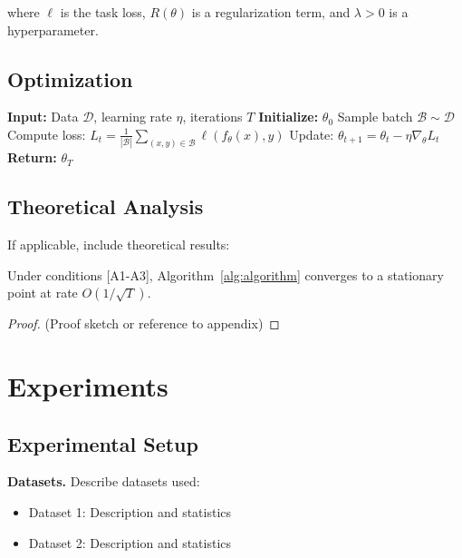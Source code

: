 \documentclass{article}
\begin{document}
where $\ell$ is the task loss, $R(\theta)$ is a regularization term,
and $\lambda > 0$ is a hyperparameter.

\subsection{Optimization}

\begin{algorithm}[tb]
   \caption{Proposed Algorithm}
   \label{alg:algorithm}
\begin{algorithmic}
   \STATE \textbf{Input:} Data $\mathcal{D}$, learning rate $\eta$, iterations $T$
   \STATE \textbf{Initialize:} $\theta_0$
       \STATE Sample batch $\mathcal{B} \sim \mathcal{D}$
       \STATE Compute loss: $L_t = \frac{1}{|\mathcal{B}|}\sum_{(x,y)\in\mathcal{B}} \ell(f_\theta(x), y)$
       \STATE Update: $\theta_{t+1} = \theta_t - \eta \nabla_\theta L_t$
   \ENDFOR
   \STATE \textbf{Return:} $\theta_T$
\end{algorithmic}
\end{algorithm}

\subsection{Theoretical Analysis}

If applicable, include theoretical results:

\begin{theorem}
\label{thm:main}
Under conditions [A1-A3], Algorithm~\ref{alg:algorithm} converges to a
stationary point at rate $O(1/\sqrt{T})$.
\end{theorem}

\begin{proof}
(Proof sketch or reference to appendix)
\end{proof}

\section{Experiments}
\label{sec:experiments}

\subsection{Experimental Setup}

\textbf{Datasets.} Describe datasets used:
\begin{itemize}
    \item Dataset 1: Description and statistics
    \item Dataset 2: Description and statistics
\end{itemize}
\end{document}
